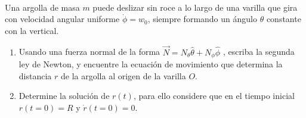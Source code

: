 \documentclass[
	spanish, %
	letterpaper, oneside
]{article}
\begin{document}
\templatePagecfg








\\

Una argolla de masa $m$ puede deslizar sin roce a lo largo de una varilla que gira con
velocidad angular uniforme $\dot\phi = w_0 $, siempre formando un ángulo $\theta$ constante con la vertical.

\begin{enumerate}[label=\alph*)]

    \item  Usando una fuerza normal de la forma $\vec N = N_\theta \hat \theta + N_\phi \hat \phi$ , escriba la segunda ley de Newton, y encuentre la ecuación de movimiento que determina la distancia $r$ de la argolla al origen de la varilla $O$.

    \item Determine la solución de $r(t)$, para ello considere que en el tiempo inicial $r(t=0) = R$ y $\dot{r}(t=0) = 0$.

\end{enumerate}
\end{document}
